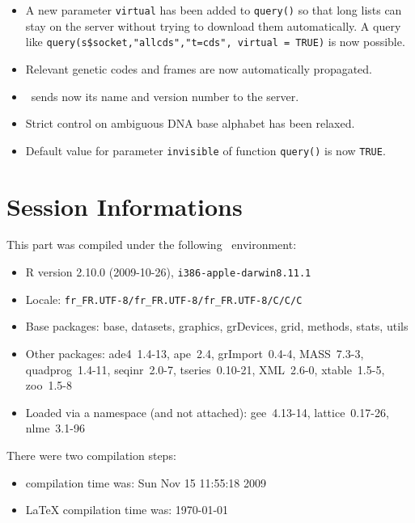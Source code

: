 \documentclass{article}
\begin{document}
\begin{itemize}
\item A new parameter \texttt{virtual} has been added to \texttt{query()} 
so that long lists can stay on the server without trying to download
them automatically. A query like \texttt{query(s\$socket,"allcds","t=cds", virtual = TRUE)} is 
now possible.

\item Relevant genetic codes and frames are now automatically propagated.

\item \Seqinr{}~sends now its name and version number to the server.

\item Strict control on ambiguous DNA base alphabet has been relaxed.

\item Default value for parameter \texttt{invisible} of function \texttt{query()} is now \texttt{TRUE}.

\end{itemize}



\section*{Session Informations}

\begin{scriptsize}

This part was compiled under the following \Rlogo{}~environment:

\begin{itemize}\raggedright
  \item R version 2.10.0 (2009-10-26), \verb|i386-apple-darwin8.11.1|
  \item Locale: \verb|fr_FR.UTF-8/fr_FR.UTF-8/fr_FR.UTF-8/C/C/C|
  \item Base packages: base, datasets, graphics, grDevices, grid,
    methods, stats, utils
  \item Other packages: ade4~1.4-13, ape~2.4, grImport~0.4-4,
    MASS~7.3-3, quadprog~1.4-11, seqinr~2.0-7, tseries~0.10-21,
    XML~2.6-0, xtable~1.5-5, zoo~1.5-8
  \item Loaded via a namespace (and not attached): gee~4.13-14,
    lattice~0.17-26, nlme~3.1-96
\end{itemize}
There were two compilation steps:

\begin{itemize}
  \item \Rlogo{} compilation time was: Sun Nov 15 11:55:18 2009
  \item \LaTeX{} compilation time was: \today
\end{itemize}

\end{scriptsize}



\clearpage
{}


\end{document}
